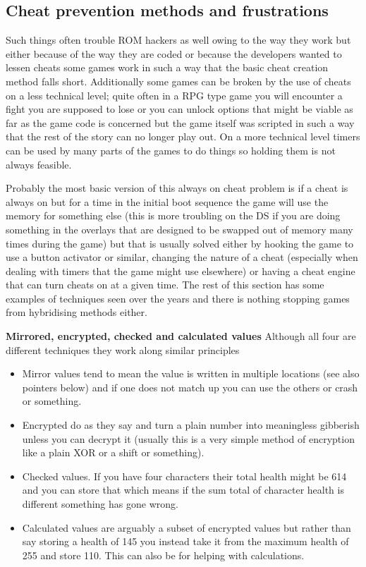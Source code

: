 \documentclass[
]{book}
\providecommand{\tightlist}{%
  \setlength{\itemsep}{0pt}\setlength{\parskip}{0pt}}
\begin{document}
\hypertarget{cheat-prevention-methods-and-frustrations}{%
\subsection{Cheat prevention methods and frustrations}\label{cheat-prevention-methods-and-frustrations}}

Such things often trouble ROM hackers as well owing to the way they work but either because of the way they are coded or because the developers wanted to lessen cheats some games work in such a way that the basic cheat creation method falls short. Additionally some games can be broken by the use of cheats on a less technical level; quite often in a RPG type game you will encounter a fight you are supposed to lose or you can unlock options that might be viable as far as the game code is concerned but the game itself was scripted in such a way that the rest of the story can no longer play out. On a more technical level timers can be used by many parts of the games to do things so holding them is not always feasible.

Probably the most basic version of this always on cheat problem is if a cheat is always on but for a time in the initial boot sequence the game will use the memory for something else (this is more troubling on the DS if you are doing something in the overlays that are designed to be swapped out of memory many times during the game) but that is usually solved either by hooking the game to use a button activator or similar, changing the nature of a cheat (especially when dealing with timers that the game might use elsewhere) or having a cheat engine that can turn cheats on at a given time. The rest of this section has some examples of techniques seen over the years and there is nothing stopping games from hybridising methods either.

\textbf{Mirrored, encrypted, checked and calculated values} Although all four are different techniques they work along similar principles

\begin{itemize}
\tightlist
\item
  Mirror values tend to mean the value is written in multiple locations (see also pointers below) and if one does not match up you can use the others or crash or something.
\item
  Encrypted do as they say and turn a plain number into meaningless gibberish unless you can decrypt it (usually this is a very simple method of encryption like a plain XOR or a shift or something).
\item
  Checked values. If you have four characters their total health might be 614 and you can store that which means if the sum total of character health is different something has gone wrong.
\item
  Calculated values are arguably a subset of encrypted values but rather than say storing a health of 145 you instead take it from the maximum health of 255 and store 110. This can also be for helping with calculations.
\end{itemize}
\end{document}
